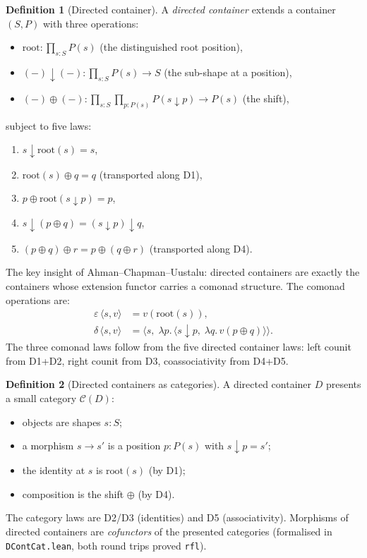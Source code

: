 \documentclass[11pt,a4paper]{article}
\theoremstyle{definition}
\newtheorem{definition}{Definition}[section]
\theoremstyle{plain}
\theoremstyle{remark}
\newcommand{\sub}{\mathop{\downarrow}}
\begin{document}
\begin{definition}[Directed container]\label{def:dcont}
A \emph{directed container} extends a container $(S, P)$ with three
operations:
\begin{itemize}[nosep]
  \item $\mathrm{root} : \prod_{s : S} P(s)$ \quad (the distinguished root position),
  \item $({-})\sub({-}) : \prod_{s : S} P(s) \to S$ \quad (the sub-shape at a position),
  \item $({-}) \oplus ({-}) : \prod_{s : S} \prod_{p : P(s)} P(s \sub p) \to P(s)$ \quad (the shift),
\end{itemize}
subject to five laws:
\begin{enumerate}[label=\textbf{D\arabic*},nosep]
  \item $s \sub \mathrm{root}(s) = s$,
  \item $\mathrm{root}(s) \oplus q = q$ \quad (transported along D1),
  \item $p \oplus \mathrm{root}(s \sub p) = p$,
  \item $s \sub (p \oplus q) = (s \sub p) \sub q$,
  \item $(p \oplus q) \oplus r = p \oplus (q \oplus r)$ \quad (transported along D4).
\end{enumerate}
\end{definition}

The key insight of Ahman--Chapman--Uustalu: directed containers are
exactly the containers whose extension functor carries a comonad
structure. The comonad operations are:
\begin{align*}
  \varepsilon\,\langle s, v \rangle &= v(\mathrm{root}(s)), \\
  \delta\,\langle s, v \rangle &= \langle s,\; \lambda p.\, \langle s \sub p,\; \lambda q.\, v(p \oplus q) \rangle \rangle.
\end{align*}
The three comonad laws follow from the five directed container laws:
left counit from D1+D2, right counit from D3, coassociativity from
D4+D5.

\begin{definition}[Directed containers as categories]\label{def:dcont-cat}
A directed container $D$ presents a small category $\mathcal{C}(D)$:
\begin{itemize}[nosep]
  \item objects are shapes $s : S$;
  \item a morphism $s \to s'$ is a position $p : P(s)$ with $s \sub p = s'$;
  \item the identity at $s$ is $\mathrm{root}(s)$ (by D1);
  \item composition is the shift $\oplus$ (by D4).
\end{itemize}
The category laws are D2/D3 (identities) and D5 (associativity).
Morphisms of directed containers are \emph{cofunctors} of the
presented categories (formalised in \texttt{DContCat.lean}, both round
trips proved \texttt{rfl}).
\end{definition}
\end{document}
